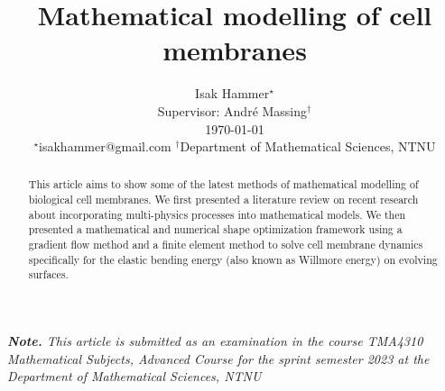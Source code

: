 \documentclass[10pt,conference]{IEEEtran}
\title{ {\Large \textbf{Mathematical modelling of cell membranes }} }
\begin{document}
\author{
Isak Hammer$^{\star}$  \\
{\small Supervisor: André Massing$^{\dagger} $  } \\
{\small  \today}\\
{\footnotesize $^\star$isakhammer@gmail.com }
{\footnotesize $^\dagger$Department of Mathematical Sciences, NTNU}\\
}

\maketitle
\begin{sloppy}
\textit{ \textbf{Note.} This article is submitted as an examination in the course TMA4310 Mathematical Subjects, Advanced Course for the sprint semester 2023 at the Department of Mathematical Sciences, NTNU \\}


\begin{abstract}
This article aims to show some of the latest methods of mathematical modelling of biological cell membranes. We first presented a literature review on recent research about incorporating multi-physics processes into mathematical models. We then presented a
mathematical and numerical shape optimization framework using a gradient flow method and
a finite element method to solve cell membrane dynamics specifically for the elastic bending energy (also known as Willmore energy) on evolving surfaces.
\end{abstract}

    
    
    
    
    

    \printbibliography
\end{sloppy}
\end{document}
